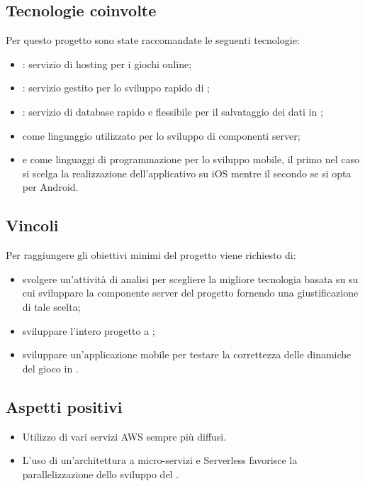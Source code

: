 \subsection{Tecnologie coinvolte}
Per questo progetto sono state raccomandate le seguenti tecnologie:
\begin{itemize}
	\item {}: servizio di hosting per i giochi online;
	\item {}: servizio gestito per lo sviluppo rapido di ;
	\item {}: servizio di database  rapido e flessibile per il salvataggio dei dati in ;
	\item {} come linguaggio utilizzato per lo sviluppo di componenti server;
	\item {} e  come linguaggi di programmazione per lo sviluppo mobile, il primo nel caso si scelga la realizzazione dell'applicativo su iOS mentre il secondo se si opta per Android.
\end{itemize}

\subsection{Vincoli}
Per raggiungere gli obiettivi minimi del progetto viene richiesto di:
\begin{itemize}
	\item svolgere un'attività di analisi per scegliere la migliore tecnologia basata su  su cui sviluppare la componente server del progetto fornendo una giustificazione di tale scelta;
	\item sviluppare l'intero progetto a ;
	\item sviluppare un'applicazione mobile per testare la correttezza delle dinamiche del gioco in .
\end{itemize}

 \subsection{Aspetti positivi}
\begin{itemize}
	\item Utilizzo di vari servizi AWS sempre più diffusi.
	\item L'uso di un'architettura a micro-servizi e Serverless favorisce la parallelizzazione dello sviluppo del .
\end{itemize}


